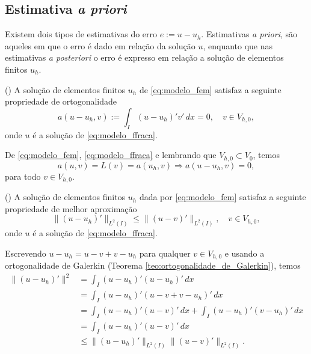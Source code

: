 \subsection{Estimativa {\it a priori}}

Existem dois tipos de estimativas do erro $e := u - u_h$. Estimativas {\it a priori}, são aqueles em que o erro é dado em relação da solução $u$, enquanto que nas estimativas {\it a posteriori} o erro é expresso em relação a solução de elementos finitos $u_h$.

\begin{teo}()\label{teo:ortogonalidade_de_Galerkin}
  A solução de elementos finitos $u_h$ de \eqref{eq:modelo_fem} satisfaz a seguinte propriedade de ortogonalidade
  \begin{equation}
    a(u-u_h,v) := \int_I (u-u_h)'v'\,dx = 0,\quad v\in V_{h,0},
  \end{equation}
onde $u$ é a solução de \eqref{eq:modelo_ffraca}.
\end{teo}
\begin{dem}
  De \eqref{eq:modelo_fem}, \eqref{eq:modelo_ffraca} e lembrando que $V_{h,0}\subset V_0$, temos
  \begin{equation}
    a(u,v) = L(v) = a(u_h,v) \Rightarrow a(u-u_h, v) = 0,
  \end{equation}
para todo $v\in V_{h,0}$.
\end{dem}

\begin{teo}()\label{teo:fem1d_melhor_aprox}
  A solução de elementos finitos $u_h$ dada por \eqref{eq:modelo_fem} satisfaz a seguinte propriedade de melhor aproximação
  \begin{equation}
    \|(u-u_h)'\|_{L^2(I)} \leq \|(u-v)'\|_{L^2(I)},\quad v\in V_{h,0},\label{eq:modelo_melhor_aprox}
  \end{equation}
onde $u$ é a solução de \eqref{eq:modelo_ffraca}.
\end{teo}
\begin{dem}
  Escrevendo $u-u_h = u-v+v-u_h$ para qualquer $v\in V_{h,0}$ e usando a ortogonalidade de Galerkin (Teorema \ref{teo:ortogonalidade_de_Galerkin}), temos
  \begin{align}
    \|(u-u_h)'\|^2 &= \int_{I} (u-u_h)'(u-u_h)'\,dx\\
    &= \int_I (u-u_h)'(u-v+v-u_h)'\,dx\\
    &= \int_I (u-u_h)'(u-v)'\,dx + \int_I (u-u_h)'(v-u_h)'\,dx\\
    &= \int_I (u-u_h)'(u-v)'\,dx\\
    &\leq \|(u-u_h)'\|_{L^2(I)}\|(u-v)'\|_{L^2(I)}.
  \end{align}
\end{dem}

